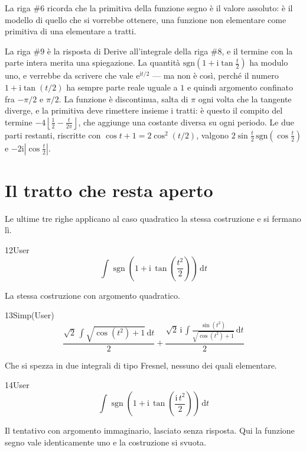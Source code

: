 La riga $\#6$ ricorda che la primitiva della funzione segno è il valore assoluto: è il modello di quello che si vorrebbe ottenere, una funzione non elementare come primitiva di una elementare a tratti.

La riga $\#9$ è la risposta di Derive all'integrale della riga $\#8$, e il termine con la parte intera merita una spiegazione. La quantità $\mathrm{sgn}\!\left(1+\mathrm{i}\tan\tfrac{t}{2}\right)$ ha modulo uno, e verrebbe da scrivere che vale $\mathrm{e}^{\mathrm{i}t/2}$ — ma non è così, perché il numero $1+\mathrm{i}\tan(t/2)$ ha sempre parte reale uguale a $1$ e quindi argomento confinato fra $-\pi/2$ e $\pi/2$. La funzione è discontinua, salta di $\pi$ ogni volta che la tangente diverge, e la primitiva deve rimettere insieme i tratti: è questo il compito del termine $-4\left\lfloor\tfrac12-\tfrac{t}{2\pi}\right\rfloor$, che aggiunge una costante diversa su ogni periodo. Le due parti restanti, riscritte con $\cos t+1=2\cos^2(t/2)$, valgono $2\sin\tfrac t2\,\mathrm{sgn}\!\left(\cos\tfrac t2\right)$ e $-2\mathrm{i}\left|\cos\tfrac t2\right|$.

\section{Il tratto che resta aperto}

Le ultime tre righe applicano al caso quadratico la stessa costruzione e si fermano lì.

\begin{espr}{12}{User}{}
\[
\int \operatorname{sgn}\!\left(1 + \mathrm{i}\, \tan\!\left(\frac{t^{2}}{2}\right)\right) \,\mathrm{d}t
\]
\end{espr}
La stessa costruzione con argomento quadratico.

\begin{espr}{13}{Simp(User)}{}
\[
\frac{\sqrt{2}\, \int \sqrt{\cos\!\left(t^{2}\right) + 1} \,\mathrm{d}t}{2} + \frac{\sqrt{2}\, \mathrm{i}\, \int \frac{\sin\!\left(t^{2}\right)}{\sqrt{\cos\!\left(t^{2}\right) + 1}} \,\mathrm{d}t}{2}
\]
\end{espr}
Che si spezza in due integrali di tipo Fresnel, nessuno dei quali elementare.

\begin{espr}{14}{User}{}
\[
\int \operatorname{sgn}\!\left(1 + \mathrm{i}\, \tan\!\left(\frac{\mathrm{i}\, t^{2}}{2}\right)\right) \,\mathrm{d}t
\]
\end{espr}
Il tentativo con argomento immaginario, lasciato senza risposta. Qui la funzione segno vale identicamente uno e la costruzione si svuota.


